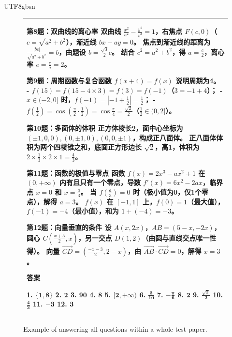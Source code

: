 \begin{CJK*}{UTF8}{gbsn}
\begin{figure}[h]
\begin{tabular}{m{15cm}}
{    
    \textbf{第8题：双曲线的离心率}
    双曲线 $ \frac{x^2}{a^2} - \frac{y^2}{b^2} = 1 $，右焦点 $ F(c, 0) $（$ c = \sqrt{a^2 + b^2} $），渐近线 $ bx - ay = 0 $。  
    焦点到渐近线的距离为 $ \frac{|bc|}{\sqrt{a^2 + b^2}} = b $，由题设 $ b = \frac{\sqrt{3}}{2}c $。  
    结合 $ c^2 = a^2 + b^2 $，得 $ a = \frac{c}{2} $，离心率 $ e = \frac{c}{a} = 2 $。  
    
    
    \textbf{第9题：周期函数与复合函数}
    $ f(x + 4) = f(x) $ 说明周期为4。  
    - $ f(15) = f(15 - 4 \times 3) = f(3) = f(-1) $（$ 3 = -1 + 4 $）；  
    - $ x \in (-2, 0] $ 时，$ f(-1) = |-1 + \frac{1}{2}| = \frac{1}{2} $；  
    - $ f(\frac{1}{2}) = \cos\left( \frac{\pi}{2} \cdot \frac{1}{2} \right) = \cos\frac{\pi}{4} = \frac{\sqrt{2}}{2} $（$ \frac{1}{2} \in (0, 2] $）。  
    
    
    \textbf{第10题：多面体的体积}
    正方体棱长2，面中心坐标为 $ (\pm 1, 0, 0), (0, \pm 1, 0), (0, 0, \pm 1) $，构成正八面体。  
    正八面体体积为两个四棱锥之和，底面正方形边长 $ \sqrt{2} $，高1，体积为 $ 2 \times \frac{1}{3} \times 2 \times 1 = \frac{4}{3} $。  
    
    
    \textbf{第11题：函数的极值与零点}
    函数 $ f(x) = 2x^3 - ax^2 + 1 $ 在 $ (0, +\infty) $ 内有且只有一个零点，导数 $ f'(x) = 6x^2 - 2ax $，临界点 $ x = 0 $ 和 $ x = \frac{a}{3} $。  
    当 $ f(\frac{a}{3}) = 0 $ 时（极小值为0，仅1个零点），解得 $ a = 3 $。  
    $ f(x) $ 在 $ [-1, 1] $ 上，$ f(0) = 1 $（最大值），$ f(-1) = -4 $（最小值），和为 $ 1 + (-4) = -3 $。  
    
    
    \textbf{第12题：向量垂直的条件}
    设 $ A(x, 2x) $，$ AB = (5 - x, -2x) $，圆心 $ C\left( \frac{x + 5}{2}, x \right) $，另一交点 $ D(1, 2) $（由圆与直线交点唯一性得）。  
    向量 $ \overrightarrow{CD} = \left( \frac{-x - 3}{2}, 2 - x \right) $，由 $ \overrightarrow{AB} \cdot \overrightarrow{CD} = 0 $，解得 $ x = 3 $。  
    
    
    \textbf{答案}
    
    1. $ \boldsymbol{\{1, 8\}} $  
    2. $ \boldsymbol{2} $  
    3. $ \boldsymbol{90} $  
    4. $ \boldsymbol{8} $  
    5. $ \boldsymbol{[2, +\infty)} $  
    6. $ \boldsymbol{\frac{3}{10}} $  
    7. $ \boldsymbol{-\frac{\pi}{6}} $  
    8. $ \boldsymbol{2} $  
    9. $ \boldsymbol{\frac{\sqrt{2}}{2}} $  
    10. $ \boldsymbol{\frac{4}{3}} $  
    11. $ \boldsymbol{-3} $  
    12. $ \boldsymbol{3} $
    }
  \\
  \bottomrule
  \end{tabular}
\caption{Example of \mimovlrl{} answering all questions within a whole test paper.}
\label{fig:case1}
\end{figure}
\renewcommand{\arraystretch}{1}
\end{CJK*}
\clearpage
